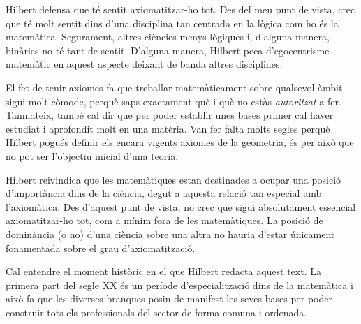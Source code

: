 \documentclass[a4paper, 11pt]{article}
\begin{document}
Hilbert defensa que té sentit axiomatitzar-ho tot. Des del meu punt de vista, crec que té molt sentit dins d'una
disciplina tan centrada en la lògica com ho és la matemàtica. Segurament, altres ciències menys lògiques i, d'alguna
manera, binàries no té tant de sentit. D'alguna manera, Hilbert peca d'egocentrisme matemàtic en aquest aspecte deixant
de banda altres disciplines.

El fet de tenir axiomes fa que treballar matemàticament sobre qualsevol àmbit sigui molt còmode, perquè saps exactament
què i què no estàs \textit{autoritzat} a fer. Tanmateix, també cal dir que per poder establir unes bases primer cal
haver estudiat i aprofondit molt en una matèria. Van fer falta molts segles perquè Hilbert pogués definir els encara
vigents axiomes de la geometria, és per això que no pot ser l'objectiu inicial d'una teoria.

Hilbert reivindica que les matemàtiques estan destinades a ocupar una posició d'importància dins de la ciència, degut a
aquesta relació tan especial amb l'axiomàtica. Des d'aquest punt de vista, no crec que sigui absolutament essencial
axiomatitzar-ho tot, com a mínim fora de les matemàtiques. La posició de dominància (o no) d'una ciència sobre una
altra no hauria d'estar únicament fonamentada sobre el grau d'axiomatització.

Cal entendre el moment històric en el que Hilbert redacta aquest text. La primera part del segle XX és un període
d'especialització dins de la matemàtica i això fa que les diverses branques posin de manifest les seves bases per poder
construir tots els professionals del sector de forma comuna i ordenada.

\printbibliography{}
\end{document}
